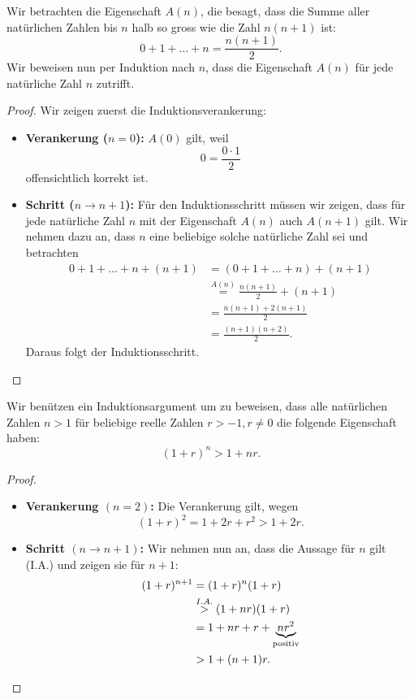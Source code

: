 \begin{bsp}
Wir betrachten die Eigenschaft $A(n)$, die besagt, dass die Summe aller natürlichen Zahlen bis $n$ halb so gross wie die Zahl $n(n+1)$ ist:
\[
0+1+\dots+n =\frac{n(n+1)}{2}.
\]
Wir beweisen nun per Induktion nach $n$, dass die Eigenschaft $A(n)$ für jede natürliche Zahl $n$ zutrifft.
\begin{proof}
Wir zeigen zuerst die Induktionsverankerung:
\begin{itemize}
\item \textbf{Verankerung ($n=0$):} $A(0)$ gilt, weil
\[
0=\frac{0\cdot 1}{2}
\]
offensichtlich korrekt ist.
\item \textbf{Schritt ($n\to n+1$):} Für den Induktionsschritt müssen wir zeigen, dass für jede natürliche Zahl $n$ mit der Eigenschaft $A(n)$ auch $A(n+1)$ gilt. Wir nehmen dazu an, dass $n$ eine beliebige solche natürliche Zahl sei und betrachten
\begin{align*}
0+1+\dots +n+(n+1)&=(0+1+\dots +n)+(n+1)\\
&\stackrel{A(n)}{=}\frac{n(n+1)}{2}+(n+1)\\
&=\frac{n(n+1)+2(n+1)}{2}\\
&=\frac{(n+1)(n+2)}{2}.
\end{align*}
Daraus folgt der Induktionsschritt.
\end{itemize}
\end{proof}
\end{bsp}

\begin{bsp}
Wir benützen ein Induktionsargument um zu beweisen, dass alle natürlichen Zahlen $n>1$ für beliebige reelle Zahlen $r>-1, r\neq 0$ die folgende Eigenschaft haben:
\[
 (1+r)^n>1+nr.
\]
\begin{proof}~
\begin{itemize}
\item \textbf{Verankerung $(n=2)$:} Die Verankerung gilt, wegen
\[
(1+r)^2=1+2r+r^2>1+2r.
\]
\item \textbf{Schritt $(n\to n+1)$:} Wir nehmen nun an, dass die Aussage für $n$ gilt (I.A.) und zeigen sie für $n+1$:
\begin{align*}
(1+r)^{n+1}&=(1+r)^n(1+r)\\
&\stackrel{I.A.}{>}(1+nr)(1+r)\\
&=1+nr+r+\underbrace{nr^2}_{\text{positiv}}\\
&>1+(n+1)r.\qedhere
\end{align*}
\end{itemize}
\end{proof}
\end{bsp}

